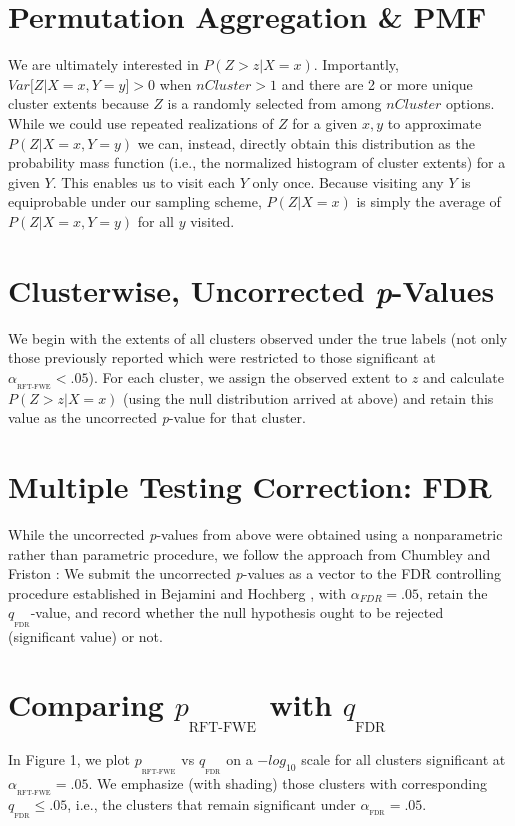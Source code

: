 \documentclass{article}
\newcommand{\subtext}[2]{
#1_{_{\text{#2}}}
}
\begin{document}
\section{Permutation Aggregation \& PMF}
We are ultimately interested in $P(Z>z|X=x)$. Importantly, $Var \big[ Z|X=x,Y=y \big] > 0$  when $nCluster>1$ and there are 2 or more unique cluster extents because $Z$ is a randomly selected from among $nCluster$ options.
While we could use repeated realizations of $Z$ for a given $x,y$ to approximate $P(Z|X=x,Y=y)$ we can, instead, directly obtain this distribution as the probability mass function (i.e., the normalized histogram of cluster extents) for a given $Y$. This enables us to visit each $Y$ only once. Because visiting any $Y$ is equiprobable under our sampling scheme, $P(Z|X=x)$ is simply the average of $P(Z|X=x,Y=y)$ for all $y$ visited.

\section{Clusterwise, Uncorrected \textit{p}-Values}

We begin with the extents of all clusters observed under the true labels (not only those previously reported which were restricted to those significant at $\subtext{\alpha}{RFT-FWE}<.05$). 
For each cluster, we assign the observed extent to $z$ and calculate $P(Z>z|X=x)$ (using the null distribution arrived at above) and retain this value as the uncorrected \textit{p}-value for that cluster.

\section{Multiple Testing Correction: FDR}

While the uncorrected \textit{p}-values from above were obtained using a nonparametric rather than parametric procedure, we follow the approach from Chumbley and Friston \cite{chumbley_false_2009}: We submit the uncorrected \textit{p}-values as a vector to the FDR controlling procedure established in Bejamini and Hochberg \cite{benjamini_controlling_1995}, with $\alpha_{FDR}=.05$, retain the $\subtext{q}{FDR}$-value, and record whether the null hypothesis ought to be rejected (significant value) or not. 

\section{Comparing $\subtext{p}{RFT-FWE}$ with $\subtext{q}{FDR}$}
In Figure 1, we plot $\subtext{p}{RFT-FWE}$ vs $\subtext{q}{FDR}$ on a $-log_{10}$ scale for all clusters significant at $\subtext{\alpha}{RFT-FWE}=.05$.
We emphasize (with shading) those clusters with corresponding $\subtext{q}{FDR}\leq .05$, i.e., the clusters that remain significant under $\subtext{\alpha}{FDR}=.05$. 




\end{document}
